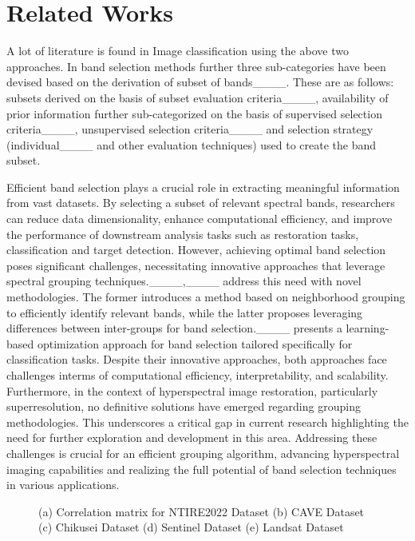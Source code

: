 \section{Related Works}
A lot of literature is found in Image classification using the above two approaches. In band selection methods further three sub-categories have been devised based on the derivation of subset of bands____. These are as follows: subsets derived on the basis of subset evaluation criteria____, availability of prior information further sub-categorized on the basis of supervised selection criteria____, unsupervised selection criteria____ and selection strategy (individual____ and other evaluation techniques) used to create the band subset.

Efficient band selection plays a crucial role in extracting meaningful information from vast datasets. By selecting a subset of relevant spectral bands, researchers can reduce data dimensionality, enhance computational efficiency, and improve the performance of downstream analysis tasks such as restoration tasks, classification and target detection. However, achieving optimal band selection poses significant challenges, necessitating innovative approaches that leverage spectral grouping techniques.____,____ address this need with novel methodologies. The former introduces a method based on neighborhood grouping to efficiently identify relevant bands, while the latter proposes leveraging differences between inter-groups for band selection.____ presents a learning-based optimization approach for band selection tailored specifically for classification tasks. Despite their innovative approaches, both approaches face challenges interms of computational efficiency, interpretability, and scalability. Furthermore, in the context of hyperspectral image restoration, particularly superresolution, no definitive solutions have emerged regarding grouping methodologies. This underscores a critical gap in current research highlighting the need for further exploration and development in this area. Addressing these challenges is crucial for an efficient grouping algorithm, advancing hyperspectral imaging capabilities and realizing the full potential of band selection techniques in various applications.
\begin{figure}[h]
    \centering
    \caption{(a) Correlation matrix for NTIRE2022 Dataset (b) CAVE Dataset (c) Chikusei Dataset (d) Sentinel Dataset (e) Landsat Dataset}
    \label{fig:foobar}
\end{figure}
